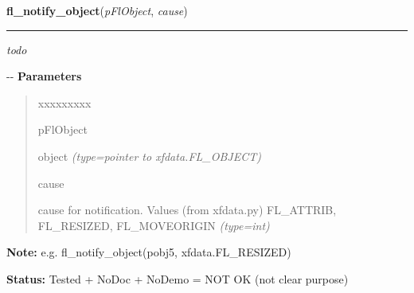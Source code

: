     \label{xformslib:flbasic:fl_notify_object}

    \vspace{0.5ex}

\hspace{.8\funcindent}\begin{boxedminipage}{\funcwidth}

    \raggedright \textbf{fl\_notify\_object}(\textit{pFlObject}, \textit{cause})

    \vspace{-1.5ex}

    \rule{\textwidth}{0.5\fboxrule}
\setlength{\parskip}{2ex}

\emph{todo}

-{}-
\setlength{\parskip}{1ex}
      \textbf{Parameters}
      \vspace{-1ex}

      \begin{quote}
        \begin{Ventry}{xxxxxxxxx}

          \item[pFlObject]


object
            {\it (type=pointer to xfdata.FL\_OBJECT)}

          \item[cause]


cause for notification. Values (from xfdata.py) FL\_ATTRIB,
FL\_RESIZED, FL\_MOVEORIGIN
            {\it (type=int)}

        \end{Ventry}

      \end{quote}

\textbf{Note:} 
e.g. fl\_notify\_object(pobj5, xfdata.FL\_RESIZED)


\textbf{Status:} 
Tested + NoDoc + NoDemo = NOT OK (not clear purpose)


    \end{boxedminipage}

    \label{xformslib:flbasic:fl_set_object_lalign}

    \vspace{0.5ex}

